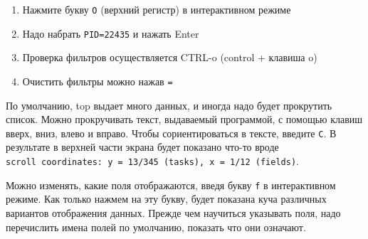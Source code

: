 \documentclass[12pt]{article}
\providecommand{\tightlist}{%
  \setlength{\itemsep}{0pt}\setlength{\parskip}{0pt}}
\begin{document}
\begin{enumerate}
\tightlist
\item
  Нажмите букву \texttt{O} (верхний регистр) в интерактивном режиме
\item
  Надо набрать \texttt{PID=22435} и нажать Enter
\item
  Проверка фильтров осуществляется CTRL-o (control + клавиша o)
\item
  Очистить фильтры можно нажав \texttt{=}
\end{enumerate}

По умолчанию, top выдает много данных, и иногда надо будет прокрутить
список. Можно прокручивать текст, выдаваемый программой, с помощью
клавиш вверх, вниз, влево и вправо. Чтобы сориентироваться в тексте,
введите \texttt{C}. В результате в верхней части экрана будет показано
что-то вроде
\texttt{scroll\ coordinates:\ y\ =\ 13/345\ (tasks),\ x\ =\ 1/12\ (fields)}.

Можно изменять, какие поля отображаются, введя букву \texttt{f} в
интерактивном режиме. Как только нажмем на эту букву, будет показана
куча различных вариантов отображения данных. Прежде чем научиться
указывать поля, надо перечислить имена полей по умолчанию, показать что
они означают.
\end{document}
